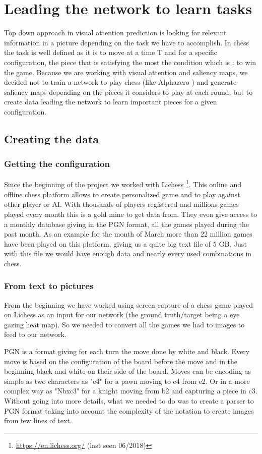 \section{Leading the network to learn tasks}

Top down approach in visual attention prediction is looking for relevant information in a picture depending on the task we have to accomplish. In chess the task is well defined as it is to move at a time T and for a specific configuration, the piece that is satisfying the most the condition which is : to win the game.
Because we are working with visual attention and saliency maps, we decided not to train a network to play chess (like Alphazero \cite{DBLP:journals/corr/abs-1712-01815}) and generate saliency maps depending on the pieces it considers to play at each round, but to create data leading the network to learn important pieces for a given configuration.

\subsection{Creating the data}
\subsubsection{Getting the configuration}
Since the beginning of the project we worked with Lichess \footnote{\url{https://en.lichess.org/} (last seen 06/2018)}. This online and offline chess platform allows to create personalized game and to play against other player or AI. With thousands of players registered and millions games played every month this is a gold mine to get data from. They even give access to a monthly database giving in the PGN format, all the games played during the past month. As an example for the month of March more than 22 million games have been played on this platform, giving us a quite big text file of 5 GB. Just with this file we would have enough data and nearly every used combinations in chess.

\subsubsection{From text to pictures}
From the beginning we have worked using screen capture of a chess game played on Lichess as an input for our network (the ground truth/target being a eye gazing heat map). So we needed to convert all the games we had to images to feed to our network.

PGN is a format giving for each turn the move done by white and black. Every move is based on the configuration of the board before the move and in the beginning black and white on their side of the board. Moves can be encoding as simple as two characters as "e4" for a pawn moving to e4 from e2. Or in a more complex way as "Nbxc3" for a knight moving from b2 and capturing a piece in c3. 
Without going into more details, what we needed to do was to create a parser to PGN format taking into account the complexity of the notation to create images from few lines of text. 

